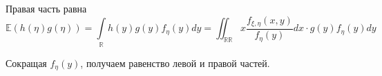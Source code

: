     Правая часть равна
    \begin{equation*}
        \mathbb{E}(h(\eta) g(\eta))=\int\limits_{\mathbb{R}} h(y) g(y) f_{\eta}(y) d y=\iint_{\mathbb{R} \mathbb{R}} x \frac{f_{\xi, \eta}(x, y)}{f_{\eta}(y)} d x \cdot g(y) f_{\eta}(y) d y
    \end{equation*}
    
    Сокращая $f_{\eta}(y)$, получаем равенство левой и правой частей.
